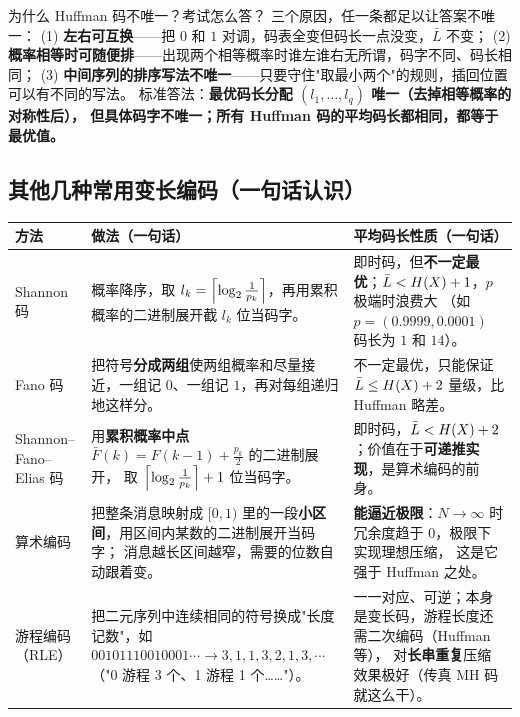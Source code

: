 \begin{qa}{为什么 Huffman 码不唯一？考试怎么答？}
三个原因，任一条都足以让答案不唯一：
(1) \textbf{左右可互换}——把 $0$ 和 $1$ 对调，码表全变但码长一点没变，$\bar L$ 不变；
(2) \textbf{概率相等时可随便排}——出现两个相等概率时谁左谁右无所谓，码字不同、码长相同；
(3) \textbf{中间序列的排序写法不唯一}——只要守住"取最小两个"的规则，插回位置可以有不同的写法。
标准答法：\textbf{最优码长分配 $(l_1,\dots,l_q)$ 唯一（去掉相等概率的对称性后），
但具体码字不唯一；所有 Huffman 码的平均码长都相同，都等于最优值。}
\end{qa}

\subsection{其他几种常用变长编码（一句话认识）}

\begin{center}
\small
\begin{tabular}{@{}p{2.7cm}p{6.6cm}p{5.6cm}@{}}
\toprule
方法 & 做法（一句话） & 平均码长性质（一句话）\\
\midrule
Shannon 码 &
概率降序，取 $l_k=\left\lceil\log_{2}\frac{1}{p_k}\right\rceil$，再用累积概率的二进制展开截 $l_k$ 位当码字。 &
即时码，但\textbf{不一定最优}；$\bar L<H\!\left(X\right)+1$，$p$ 极端时浪费大
（如 $p=(0.9999,0.0001)$ 码长为 $1$ 和 $14$）。\\
\addlinespace
Fano 码 &
把符号\textbf{分成两组}使两组概率和尽量接近，一组记 $0$、一组记 $1$，再对每组递归地这样分。 &
不一定最优，只能保证 $\bar L\le H\!\left(X\right)+2$ 量级，比 Huffman 略差。\\
\addlinespace
Shannon--Fano--Elias 码 &
用\textbf{累积概率中点} $\bar F(k)=F(k-1)+\frac{p_k}{2}$ 的二进制展开，
取 $\left\lceil\log_{2}\frac{1}{p_k}\right\rceil+1$ 位当码字。 &
即时码，$\bar L<H\!\left(X\right)+2$；价值在于\textbf{可递推实现}，是算术编码的前身。\\
\addlinespace
算术编码 &
把整条消息映射成 $[0,1)$ 里的一段\textbf{小区间}，用区间内某数的二进制展开当码字；
消息越长区间越窄，需要的位数自动跟着变。 &
\textbf{能逼近极限}：$N\to\infty$ 时冗余度趋于 $0$，极限下实现理想压缩，
这是它强于 Huffman 之处。\\
\addlinespace
游程编码（RLE） &
把二元序列中连续相同的符号换成"长度记数"，如 $00101110010001\cdots\to3,1,1,3,2,1,3,\cdots$
（"0 游程 3 个、1 游程 1 个……"）。 &
一一对应、可逆；本身是变长码，游程长度还需二次编码（Huffman 等），
对\textbf{长串重复}压缩效果极好（传真 MH 码就这么干）。\\
\bottomrule
\end{tabular}
\end{center}

